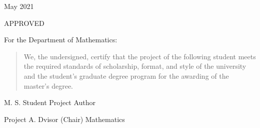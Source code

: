 \documentclass[12pt,leqno]{article}
\theoremstyle{remark}
\begin{document}
\begin{center}
May 2021 %
\end{center}
\setcounter{page}{1}
\thispagestyle{empty}
\newpage

\begin{center}
APPROVED
\end{center}

\begin{center}
For the Department of Mathematics:
\end{center}


\noindent
\begin{quote}
We, the undersigned, certify that the project of the following student meets the required standards of scholarship, format, and style of the university and the student's graduate degree program for the awarding of the master's degree.
\end{quote}

\vskip 0.5in

\begin{center}
M. S. Student  %
\vskip -0.1in
\makebox[\textwidth]{\hspace{4pc}\hrulefill\hspace{4pc}}
Project Author
\end{center}

\vskip 0.5in

\begin{center}
 \makebox[\textwidth]{\hspace{2pc}\hrulefill\hspace{2pc}}
 \end{center}
 \vskip -0.2in
 \hspace{2pc}%
Project A. Dvisor (Chair) \hfill Mathematics  \hspace{2pc}
\end{document}
